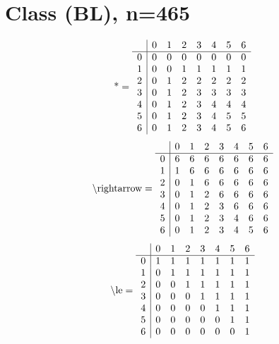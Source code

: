 \documentclass[11pt]{article}
\begin{document}
\section{Class (BL), n=465}
\[\text{*} = 
\begin{array}{r | r r r r r r r}
 & 0 & 1 & 2 & 3 & 4 & 5 & 6 \\ \hline
0 & 0 & 0 & 0 & 0 & 0 & 0 & 0 \\
1 & 0 & 0 & 1 & 1 & 1 & 1 & 1 \\
2 & 0 & 1 & 2 & 2 & 2 & 2 & 2 \\
3 & 0 & 1 & 2 & 3 & 3 & 3 & 3 \\
4 & 0 & 1 & 2 & 3 & 4 & 4 & 4 \\
5 & 0 & 1 & 2 & 3 & 4 & 5 & 5 \\
6 & 0 & 1 & 2 & 3 & 4 & 5 & 6 \\
\end{array}
\]
\[\text{\textbackslash rightarrow} = 
\begin{array}{r | r r r r r r r}
 & 0 & 1 & 2 & 3 & 4 & 5 & 6 \\ \hline
0 & 6 & 6 & 6 & 6 & 6 & 6 & 6 \\
1 & 1 & 6 & 6 & 6 & 6 & 6 & 6 \\
2 & 0 & 1 & 6 & 6 & 6 & 6 & 6 \\
3 & 0 & 1 & 2 & 6 & 6 & 6 & 6 \\
4 & 0 & 1 & 2 & 3 & 6 & 6 & 6 \\
5 & 0 & 1 & 2 & 3 & 4 & 6 & 6 \\
6 & 0 & 1 & 2 & 3 & 4 & 5 & 6 \\
\end{array}
\]
\[\text{\textbackslash le} = 
\begin{array}{r | r r r r r r r}
 & 0 & 1 & 2 & 3 & 4 & 5 & 6 \\ \hline
0 & 1 & 1 & 1 & 1 & 1 & 1 & 1 \\
1 & 0 & 1 & 1 & 1 & 1 & 1 & 1 \\
2 & 0 & 0 & 1 & 1 & 1 & 1 & 1 \\
3 & 0 & 0 & 0 & 1 & 1 & 1 & 1 \\
4 & 0 & 0 & 0 & 0 & 1 & 1 & 1 \\
5 & 0 & 0 & 0 & 0 & 0 & 1 & 1 \\
6 & 0 & 0 & 0 & 0 & 0 & 0 & 1 \\
\end{array}
\]
\end{document}
